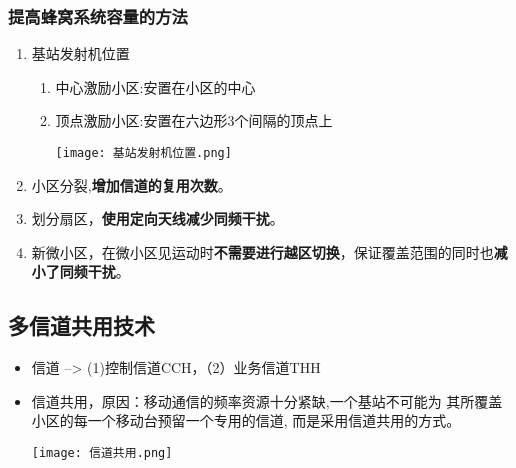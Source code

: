	\subsubsection{提高蜂窝系统容量的方法
	}
	\begin{enumerate}
		\item 	基站发射机位置
		\begin{enumerate}
			\item  中心激励小区:安置在小区的中心
			\item  顶点激励小区:安置在六边形3个间隔的顶点上 \\
			\begin{center}
			\texttt{[image: 基站发射机位置.png]}
			\end{center}
		\end{enumerate}
		\item 小区分裂,\textbf{增加信道的复用次数}。
		\item 划分扇区，\textbf{使用定向天线减少同频干扰}。
		\item 新微小区，在微小区见运动时\textbf{不需要进行越区切换}，保证覆盖范围的同时也\textbf{减小了同频干扰}。
	\end{enumerate}
	\subsection{多信道共用技术}
	\begin{itemize}
		\item 信道 --> (1)控制信道CCH，（2）业务信道THH
		\item 信道共用，原因：移动通信的频率资源十分紧缺,一个基站不可能为
		其所覆盖小区的每一个移动台预留一个专用的信道,
		而是采用信道共用的方式。
		\begin{center}
			\texttt{[image: 信道共用.png]}
		\end{center}
	\end{itemize}
